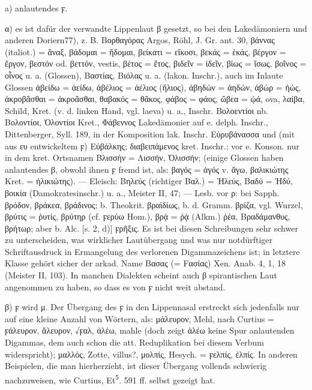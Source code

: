 a) anlautendes ϝ.

α) es ist dafür der verwandte Lippenlaut β gesetzt, so bei den Lakedämoniern und
anderen Doriern77), z. B. Βορθαγόρας Argos, Röhl, J. Gr. ant. 30, βάννας
(italiot.) = ἄναξ, βάδομαι = ἥδομαι, βείκατι = εἴκοσι, βεκάς = ἑκάς, βέργον =
ἔργον, βεστόν od. βεττόν, vestis, βέτος = ἔτος, βιδεῖν = ἰδεῖν, βίως = ἴσως,
βοῖνος = οἶνος u. a. (Glossen), Βαστίας, Βιόλας u. a. (lakon. Inschr.), auch im
Inlaute Glossen ἀβείδω = ἀείδω, ἀβέλιος = ἀέλιος (ἥλιος), ἀβηδών = ἀηδών, ἀβώρ =
ἠώς, ἀκροβᾶσθαι = ἀκροᾶσθαι, θαβακός = θᾶκος, φάβος = φάος, ὤβεα = ᾠά, ova,
λαίβα, Schild, Kret. (v. d. linken Hand, vgl.  laeva) u. a., Inschr.
Βολοεντίοι nb. Βολοντίοι, Ὀλοντίοι Kret., Φάβεννος Lakedämonier auf e. delph.
Inschr., Dittenberger, Syll. 189, in der Komposition lak. Inschr. Εὐρυβάνασσα
und (mit aus ευ entwickeltem ϝ) Εὐβάλκης; διαβειπάμενος kret. Inschr.; vor e.
Konson. nur in dem kret. Ortsnamen Βλισσήν = Λισσήν, Ὀλισσήν; (einige Glossen
haben anlautendes β, obwohl ihnen ϝ fremd ist, als: βαγός = ἀγός v. ἄγω,
βαλικιώτης Kret. = ἡλικιώτης). — Eleisch: Βηλεύς (richtiger Βαλ.) = Ἠλεύς, Βαδύ
= Ἡδύ, βοικία (Damokratesinschr.) u. a., Meister II, 47; — Lesb. vor ρ: bei
Sapph. βρόδον, βράκεα, βράδινος; b. Theokrit. βραϊδίως, b. d. Gramm. βρίζα, vgl.
Wurzel, βρύτις = ῥυτίς, βρύτηρ (cf. ϝερύω Hom.), βρᾴ = ῥᾴ (Alkm.) ῥέα,
Βραδάμανθυς, βρήτωρ; aber b. Alc. [s. 2, d)] ϝρῆξις. Es ist bei diesen
Schreibungen sehr schwer zu unterscheiden, was wirklicher Lautübergang und was
nur notdürftiger Schriftausdruck in Ermangelung des verlorenen Digammazeichens
ist; in letztere Klasse gehört sicher der arkad. Name Βασας (= Fασίας) Xen.
Anab. 4, 1, 18 (Meister II, 103). In manchen Dialekten scheint auch β
spirantischen Laut angenommen zu haben, so dass es von ϝ nicht weit abstand. 

β) ϝ wird μ. Der Übergang des ϝ in den Lippennasal erstreckt sich jedenfalls nur
auf eine kleine Anzahl von Wörtern, als: μάλευρον, Mehl, nach Curtius =
ϝάλευρον, ἄλευρον, √ϝαλ, ἀλέω, mahle (doch zeigt ἀλέω keine Spur
anlautenden Digammas, dem auch schon die att. Reduplikation bei diesem Verbum
widerspricht); μαλλός, Zotte,  villus?, μολπίς, Hesych. = ϝελπίς, ἐλπίς. In
anderen Beispielen, die man hierherzieht, ist dieser Übergang vollends schwierig
nachzuweisen, wie Curtius, Et\textsuperscript{5}. 591 ff. selbst gezeigt hat. 

